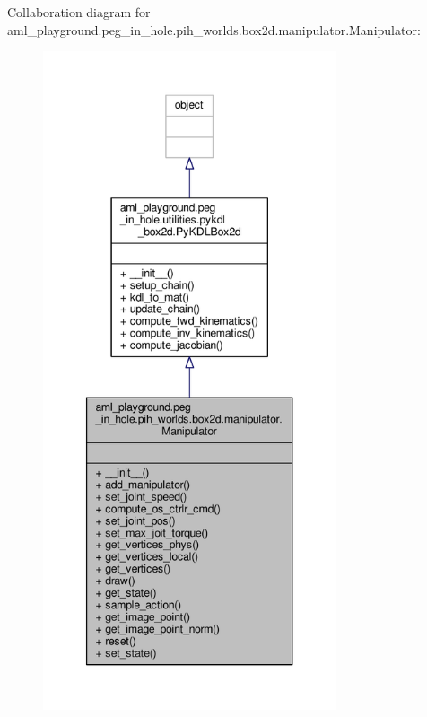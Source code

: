 Collaboration diagram for aml\-\_\-playground.\-peg\-\_\-in\-\_\-hole.\-pih\-\_\-worlds.\-box2d.\-manipulator.\-Manipulator\-:\nopagebreak
\begin{figure}[H]
\begin{center}
\leavevmode
\includegraphics[height=550pt]{classaml__playground_1_1peg__in__hole_1_1pih__worlds_1_1box2d_1_1manipulator_1_1_manipulator__coll__graph}
\end{center}
\end{figure}
